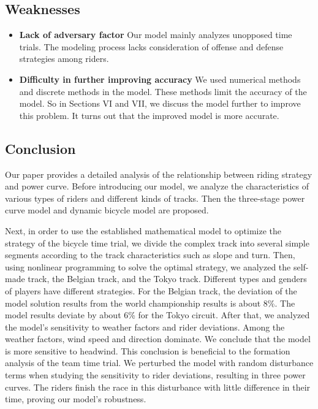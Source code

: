 \documentclass{mcmthesis}
\begin{document}
\subsection{Weaknesses}
\begin{itemize}
\item \textbf{ Lack of adversary factor} Our model mainly analyzes unopposed time trials. The modeling
process lacks consideration of offense and defense strategies among riders.
\item  \textbf{Difficulty in further improving accuracy} We used numerical methods and discrete methods
in the model. These methods limit the accuracy of the model. So in Sections VI and VII, we
discuss the model further to improve this problem. It turns out that the improved model is
more accurate.
\end{itemize}
\subsection{Conclusion}
Our paper provides a detailed analysis of the relationship between riding strategy and power
curve. Before introducing our model, we analyze the characteristics of various types of riders and
different kinds of tracks. Then the three-stage power curve model and dynamic bicycle model are
proposed.

Next, in order to use the established mathematical model to optimize the strategy of the bicycle
time trial, we divide the complex track into several simple segments according to the track characteristics such as slope and turn. Then, using nonlinear programming to solve the optimal strategy,
we analyzed the self-made track, the Belgian track, and the Tokyo track. Different types and genders
of players have different strategies. For the Belgian track, the deviation of the model solution results
from the world championship results is about 8\%. The model results deviate by about 6\% for the
Tokyo circuit. After that, we analyzed the model’s sensitivity to weather factors and rider deviations.
Among the weather factors, wind speed and direction dominate. We conclude that the model is
more sensitive to headwind. This conclusion is beneficial to the formation analysis of the team time
trial. We perturbed the model with random disturbance terms when studying the sensitivity to rider
deviations, resulting in three power curves. The riders finish the race in this disturbance with little
difference in their time, proving our model’s robustness.
\nocite{*} 
  
\end{document}
